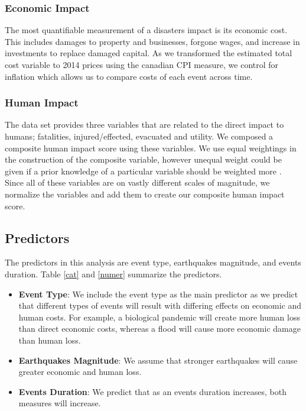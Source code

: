 \subsubsection{Economic Impact}
The most quantifiable measurement of a disasters impact is its economic cost. This includes damages to property and businesses, forgone wages, and increase in investments to replace damaged capital. As we transformed the estimated total cost variable to 2014 prices using the canadian CPI measure, we control for inflation which allows us to compare costs of each event across time.
\subsubsection{Human Impact}
The data set provides three variables that are related to the direct impact to humans; fatalities, injured/effected, evacuated and utility. We composed a composite human impact score using these variables. We use equal weightings in the construction of the composite variable, however unequal weight could be given if a prior knowledge of a particular variable should be weighted more \cite{song2013composite}.
Since all of these variables are on vastly different scales of magnitude, we normalize the variables and add them to create our composite human impact score. 

\subsection{Predictors}
The predictors in this analysis are event type, earthquakes magnitude, and events duration.
Table \ref{cat} and \ref{numer} summarize the predictors.
\begin{itemize}
	\item \textbf{Event Type}: We include the event type as the main predictor as we predict that different types of events will result with differing effects on economic and human costs. For example, a biological pandemic will create more human loss than direct economic costs, whereas a flood will cause more economic damage than human loss.
	\item \textbf{Earthquakes Magnitude}: We assume that stronger earthquakes will cause greater economic and human loss.
	\item \textbf{Events Duration}: We predict that as an events duration increases, both measures will increase. 
\end{itemize}
\newpage

















